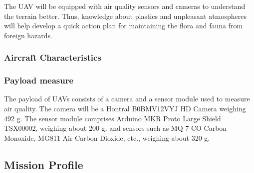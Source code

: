 \documentclass[12 pt]{article}
\begin{document}
The UAV will be equipped with air quality sensors and cameras to understand the terrain better. Thus, knowledge about plastics and unpleasant atmospheres will help develop a quick action plan for maintaining the flora and fauna from foreign hazards.

\subsubsection{Aircraft Characteristics}
\begin{table}[h]
\centering
{}
\caption{Initial Mission Requirements}
\label{Mission Requirements}
\end{table}

\subsubsection{Payload measure}
The payload of UAVs consists of a camera and a sensor module used to measure air quality. The camera will be a Hontral B0BMV12VYJ HD Camera weighing 492 g. The sensor module comprises Arduino MKR Proto Large Shield TSX00002, weighing about 200 g, and sensors such as MQ-7 CO Carbon Monoxide, MG811 Air Carbon Dioxide, etc., weighing about 320 g.

\subsection{Mission Profile}
\end{document}
